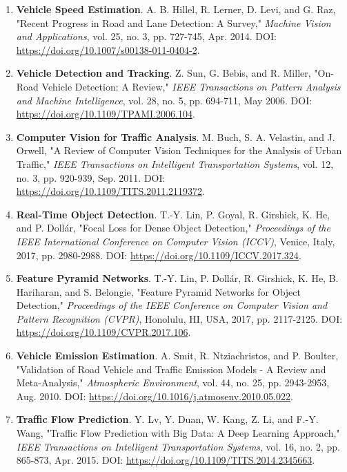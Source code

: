 \begin{enumerate}[resume]
    \item \textbf{Vehicle Speed Estimation}. A. B. Hillel, R. Lerner, D. Levi, and G. Raz, 
    "Recent Progress in Road and Lane Detection: A Survey," 
    \textit{Machine Vision and Applications}, vol. 25, no. 3, pp. 727-745, Apr. 2014. 
    DOI: \url{https://doi.org/10.1007/s00138-011-0404-2}.
    
    \item \textbf{Vehicle Detection and Tracking}. Z. Sun, G. Bebis, and R. Miller, "On-Road Vehicle Detection: A Review," 
    \textit{IEEE Transactions on Pattern Analysis and Machine Intelligence}, vol. 28, no. 5, pp. 694-711, May 2006. 
    DOI: \url{https://doi.org/10.1109/TPAMI.2006.104}.
    
    \item \textbf{Computer Vision for Traffic Analysis}. M. Buch, S. A. Velastin, and J. Orwell, 
    "A Review of Computer Vision Techniques for the Analysis of Urban Traffic," 
    \textit{IEEE Transactions on Intelligent Transportation Systems}, vol. 12, no. 3, pp. 920-939, Sep. 2011. 
    DOI: \url{https://doi.org/10.1109/TITS.2011.2119372}.
    
    \item \textbf{Real-Time Object Detection}. T.-Y. Lin, P. Goyal, R. Girshick, K. He, and P. Dollár, 
    "Focal Loss for Dense Object Detection," \textit{Proceedings of the IEEE International Conference on Computer Vision (ICCV)}, 
    Venice, Italy, 2017, pp. 2980-2988. DOI: \url{https://doi.org/10.1109/ICCV.2017.324}.
    
    \item \textbf{Feature Pyramid Networks}. T.-Y. Lin, P. Dollár, R. Girshick, K. He, B. Hariharan, and S. Belongie, 
    "Feature Pyramid Networks for Object Detection," \textit{Proceedings of the IEEE Conference on Computer Vision and Pattern Recognition (CVPR)}, 
    Honolulu, HI, USA, 2017, pp. 2117-2125. DOI: \url{https://doi.org/10.1109/CVPR.2017.106}.
    
    \item \textbf{Vehicle Emission Estimation}. A. Smit, R. Ntziachristos, and P. Boulter, 
    "Validation of Road Vehicle and Traffic Emission Models - A Review and Meta-Analysis," 
    \textit{Atmospheric Environment}, vol. 44, no. 25, pp. 2943-2953, Aug. 2010. 
    DOI: \url{https://doi.org/10.1016/j.atmosenv.2010.05.022}.
    
    \item \textbf{Traffic Flow Prediction}. Y. Lv, Y. Duan, W. Kang, Z. Li, and F.-Y. Wang, 
    "Traffic Flow Prediction with Big Data: A Deep Learning Approach," 
    \textit{IEEE Transactions on Intelligent Transportation Systems}, vol. 16, no. 2, pp. 865-873, Apr. 2015. 
    DOI: \url{https://doi.org/10.1109/TITS.2014.2345663}.
    

\end{enumerate}
